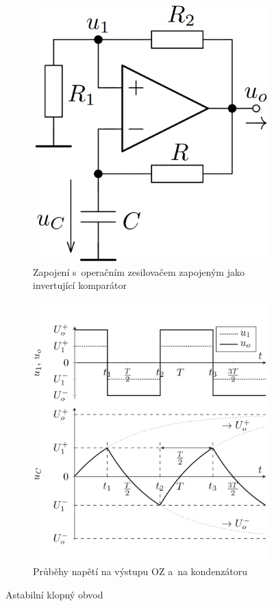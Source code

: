 \documentclass[a4paper,12pt]{article}   %
\begin{document}
\begin{figure}[h!]
    \centering
    \begin{subfigure}{.4\textwidth}
        \centering
        \includegraphics[width=.8\textwidth]{astab_klop.PNG}
        \caption{Zapojení s~operačním zesilovačem zapojeným jako invertující komparátor}
        \label{sch:astab:kl}
    \end{subfigure}
    \hspace{2em}%
    \begin{subfigure}{.4\textwidth}
        \centering
        \includegraphics[width =.8\textwidth]{astab_klop-prubehy.PNG}
        \caption{Průběhy napětí na výstupu OZ a~na kondenzátoru}
        \label{graf:astab:kl}
    \end{subfigure}
    \caption{Astabilní klopný obvod}
\end{figure}
\end{document}
